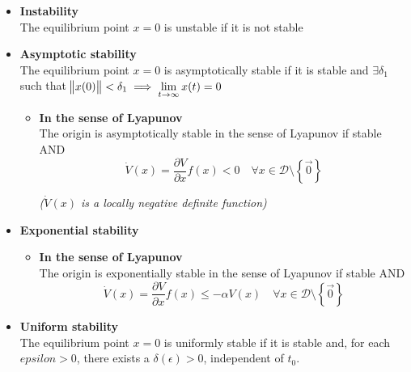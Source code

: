 {\begin{itemize}
    
    \item \textbf{Instability}\\
    The equilibrium point $x=0$ is unstable if it is not stable
    
    
    \item \textbf{Asymptotic stability}\\
    The equilibrium point $x=0$ is asymptotically stable if it is stable and $\exists \delta_1$ such that $\norm{x(0)}<\delta_1 \implies \lim\limits_{t\rightarrow\infty}x(t)=0$

    \begin{itemize}
        \item \textbf{In the sense of Lyapunov}\\
        The origin is asymptotically stable in the sense of Lyapunov if stable AND
        \[\dot{V}(x)=\frac{\partial V}{\partial x} f(x) < 0 \quad \forall x \in \mathcal{D}\setminus\left\{\Vec{0}\right\}\]
        \begin{center}
            \textit{($\dot{V}(x)$ is a locally negative definite function)}
        \end{center}
    \end{itemize}
    
    \item \textbf{Exponential stability}\\  
    \begin{itemize}
        \item \textbf{In the sense of Lyapunov}\\
        The origin is exponentially stable in the sense of Lyapunov if stable AND
        \[\dot{V}(x)=\frac{\partial V}{\partial x} f(x) \leq -\alpha V(x) \quad \forall x \in \mathcal{D}\setminus\left\{\Vec{0}\right\}\]
    \end{itemize}
    
    \item \textbf{Uniform stability}\\
    The equilibrium point $x=0$ is uniformly stable if it is stable and, for each $epsilon>0$, there exists a $\delta(\epsilon)>0$, independent of $t_0$.
\end{itemize}
}
    
